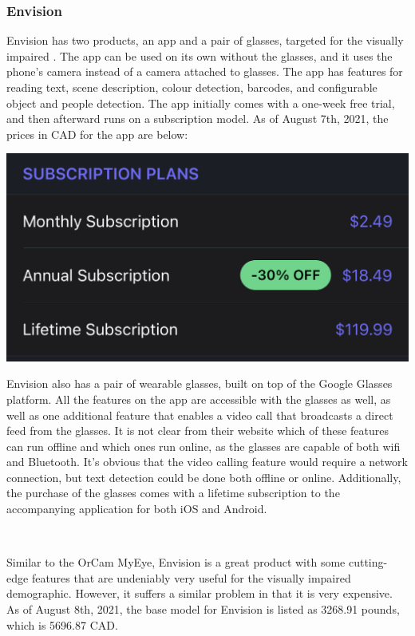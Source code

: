 \documentclass[a4paper,11pt]{article}
\begin{document}
\subsubsection{Envision}
Envision has two products, an app and a pair of glasses, targeted for the visually impaired \cite{envision}. The app can be used on its own without the glasses, and it uses the phone's camera instead of a camera attached to glasses. The app has features for reading text, scene description, colour detection, barcodes, and configurable object and people detection. The app initially comes with a one-week free trial, and then afterward runs on a subscription model. As of August 7th, 2021, the prices in CAD for the app are below:
\begin{center}
    \includegraphics[width={0.7\linewidth}]{img/envision_app_price.jpeg}
\end{center}

\noindent
Envision also has a pair of wearable glasses, built on top of the Google Glasses platform. All the features on the app are accessible with the glasses as well, as well as one additional feature that enables a video call that broadcasts a direct feed from the glasses. It is not clear from their website which of these features can run offline and which ones run online, as the glasses are capable of both wifi and Bluetooth. It's obvious that the video calling feature would require a network connection, but text detection could be done both offline or online. Additionally, the purchase of the glasses comes with a lifetime subscription to the accompanying application for both iOS and Android.

\ 

\noindent
Similar to the OrCam MyEye, Envision is a great product with some cutting-edge features that are undeniably very useful for the visually impaired demographic. However, it suffers a similar problem in that it is very expensive. As of August 8th, 2021, the base model for Envision is listed as 3268.91 pounds, which is 5696.87 CAD.
\end{document}
